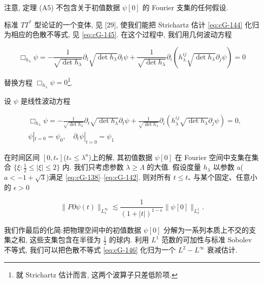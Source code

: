 \begin{remark*}
注意, 定理 (A5) 不包含关于初值数据 $\psi[0]$ 的 Fourier 支集的任何假设. 
\end{remark*}


标准 $TT^{*}$ 型论证的一个变体, 见 {[}29{]}, 使我们能把 Strichartz 估计 \eqref{eq:cG-144} 化归为相应的色散不等式, 见 \eqref{eq:cG-145}. 在这个过程中, 我们用几何波动方程

\[
\Box_{h_{\lambda}}\psi = -\frac{1}{\sqrt{\det h_{\lambda}}}\partial_t\sqrt{\det h_\lambda}\partial_t\psi + \frac{1}{\sqrt{\det h_\lambda}}\partial_i(h_\lambda^{ij}\sqrt{\det h_\lambda}\partial_j\psi) = 0
\]

替换方程 $\Box_{h_{\lambda}}\psi = 0$\footnote{就 Strichartz 估计而言, 这两个波算子只差低阶项. }. 

\begin{theorem}[A6]\label{thm:cG-6.19}
设 $\psi$ 是线性波动方程

\begin{equation}
\begin{aligned}
&\Box_{h_{\lambda}}\psi = -\frac{1}{\sqrt{\det h_{\lambda}}}\partial_{t}\sqrt{\det h_{\lambda}}\partial_{t}\psi + \frac{1}{\sqrt{\det h_{\lambda}}}\partial_{i}(h_{\lambda}^{ij}\sqrt{\det h_{\lambda}}\partial_{j}\psi) = 0,  \\
&\psi|_{t = 0} = \psi_{0},  \quad \partial_{t}\psi|_{t = 0} = \psi_{1}
\end{aligned}\label{eq:cG-145}
\end{equation}

在时间区间 $[0,  t_{*}]$($t_{*} \leq \lambda^{a}$)上的解, 其初值数据 $\psi[0]$ 在 Fourier 空间中支集在集合 $\{\xi : \frac{1}{2} \leq |\xi| \leq 2\}$ 内. 我们只考虑参数 $\lambda \geq \Lambda$ 的大值. 假设度量 $h_{\lambda}$ 以参数 a($a < -1 + \sqrt{3}$)满足 \eqref{eq:cG-138}--\eqref{eq:cG-142}. 则对所有 $t \leq t_{*}$ 与某个固定、任意小的 $\epsilon > 0$

\begin{equation}
\|P\partial\psi(t)\|_{L_{x}^{\infty}} \lesssim \frac{1}{(1 + |t|)^{1 - \epsilon}}\|\psi[0]\|_{L_{x}^{1}}.\label{eq:cG-146}
\end{equation}
\end{theorem}

我们作最后的化简:把物理空间中的初值数据 $\psi[0]$ 分解为一系列本质上不交的支集之和, 这些支集包含在半径为 $\frac{1}{2}$ 的球内. 利用 $L^{1}$ 范数的可加性与标准 Sobolev 不等式, 我们可以把色散不等式 \eqref{eq:cG-146} 化归为一个 $L^{2}-L^{\infty}$ 衰减估计. 

